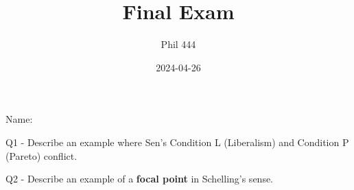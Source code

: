 \documentclass[
  12pt,
  letterpaper,
  DIV=11,
  numbers=noendperiod]{scrartcl}
\title{Final Exam}
\author{Phil 444}
\date{2024-04-26}
\renewcommand\maketitle{
  \fancyhead[C]{
    \thetitle
    \ifx \theauthor\empty  \else \ – \theauthor \fi
    \ifx \thedate\empty  \else \ – \thedate \ \fi
  }
}
\begin{document}
\maketitle

Name: \dotfill

Q1 - Describe an example where Sen's Condition L (Liberalism) and
Condition P (Pareto) conflict.

\vspace{0.3cm} \dotfill

\vspace{0.3cm} \dotfill

\vspace{0.3cm} \dotfill

\vspace{0.3cm} \dotfill

\vspace{0.3cm} \dotfill

\vspace{0.3cm} \dotfill

\vspace{0.3cm} \dotfill

\vspace{0.3cm} \dotfill

\vspace{0.3cm} \dotfill

\vspace{0.3cm} \dotfill

\vspace{0.3cm} \dotfill

\vspace{0.3cm} \dotfill

\vspace{0.3cm} \dotfill

\vspace{0.3cm} \dotfill

\vspace{0.3cm} \dotfill

\vspace{0.3cm} \dotfill

\vspace{0.3cm} \dotfill

\vspace{0.3cm} \dotfill

\newpage

Q2 - Describe an example of a \textbf{focal point} in Schelling's sense.

\vspace{0.3cm} \dotfill

\vspace{0.3cm} \dotfill
\end{document}
